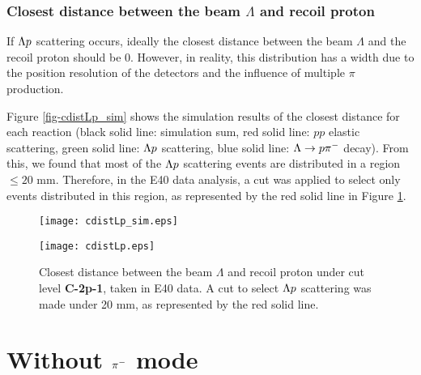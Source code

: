 \subsubsection{Closest distance between the beam $\Lambda$ and recoil proton}

If $\Lp$ scattering occurs, ideally the closest distance between the beam $\Lambda$ and the recoil proton should be 0. However, in reality, this distribution has a width due to the position resolution of the detectors and the influence of multiple $\pi$ production.

Figure \ref{fig-cdistLp_sim} shows the simulation results of the closest distance for each reaction (black solid line: simulation sum, red solid line: $pp$ elastic scattering, green solid line: $\Lp$ scattering, blue solid line: $\Ldecay$ decay). From this, we found that most of the $\Lp$ scattering events are distributed in a region $\leq20$ mm. Therefore, in the E40 data analysis, a cut was applied to select only events distributed in this region, as represented by the red solid line in Figure \ref{fig-cdistLp}.
\begin{figure}[!h]
  \begin{minipage}[t]{0.48\columnwidth}
    \centering
    \texttt{[image: cdistLp\_sim.eps]}
    \caption{Simulation of the closest distance between the beam $\Lambda$ and recoil proton under cut level {\bf C-2p-1}, taken in simulation data. The black solid line represents the simulation sum, the red solid line $pp$ elastic scattering, the green solid line $\Lp$ scattering, and the blue solid line $\Ldecay$ decay.}
    \label{fig-cdistLp_sim}
  \end{minipage}
  \hspace{0.04\columnwidth} %
  \begin{minipage}[t]{0.48\columnwidth}
    \centering
    \texttt{[image: cdistLp.eps]}
    \caption{Closest distance between the beam $\Lambda$ and recoil proton under cut level {\bf C-2p-1}, taken in E40 data. A cut to select $\Lp$ scattering was made under 20 mm, as represented by the red solid line.}
    \label{fig-cdistLp}
  \end{minipage}
\end{figure}


\clearpage
\section{Without $\pi^{-}$ mode}
\label{sec-Lp_2p_woPi}

